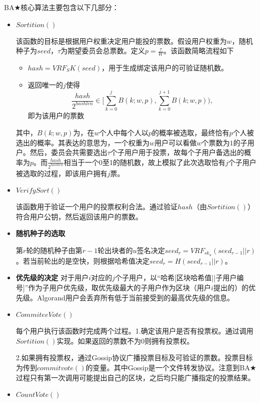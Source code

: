 BA$\bigstar$核心算法主要包含以下几部分：
\begin{itemize}
	\item $Sortition()$
	
	该函数的目标是根据用户权重决定用户能投的票数。假设用户权重为$w$，随机种子为$seed$，$\tau$为期望委员会总票数。定义$p=\frac{\tau}{W}$。该函数简略流程如下
	\begin{itemize}
		\item $hash= VRF_SK(seed)$，用于生成绑定该用户的可验证随机数。
		\item 返回唯一的$j$使得
		$$\frac{hash}{2^{hashlen}} \in [\sum_{k=0}^j B(k;w,p),\sum_{k=0}^{j+1}B(k;w,p)),$$即为该用户的票数
	\end{itemize}
	其中，$B(k;w,p)$为，在$w$个人中每个人以$p$的概率被选取，最终恰有$p$个人被选出的概率。其表达的意思为，一个权重为$w$用户可以看做$w$个票数为$1$的子用户。然后，委员会共需要选出$\tau$个子用户用于投票，故每个子用户备选出的概率为$p$。而$\frac{hash}{2^{hashlen}}$相当于一个0至1的随机数，故上模拟了此次选取恰有$j$个子用户被选取的过程，即该用户拥有$j$票。
		
	\item $VerifySort()$
	
	该函数用于验证一个用户的投票权利合法。通过验证$hash$（由$Sortition()$）符合用户公钥，然后返回该用户的票数。
	
	\item \textbf{随机种子的选取}
	
	第$r$轮的随机种子由第$r-1$轮出块者的$u$签名决定$seed_r=VRF_{sk_u}(seed_{r-1}||r)$。若当前轮出的是空快，则根据哈希值决定$seed_r=H(seed_{r-1}||r)$。
	
	\item \textbf{优先级的决定}
	对于用户$i$对应的$j$个子用户，以“哈希[区块哈希值||子用户编号]”作为子用户优先级，取优先级最大的子用户作为区块（用户$i$提出的）的优先级。Algorand用户会丢弃所有低于当前接受到的最高优先级的信息。
	
	\item $CommiteeVote()$
	
	每个用户执行该函数时完成两个过程。1.确定该用户是否有投票权。通过调用$Sortition()$实现。如果返回的票数不为0则拥有投票权。
	
	2.如果拥有投票权，通过Gossip协议广播投票目标及可验证的票数。投票目标为传到$commitvote()$的变量。其中Gossip是一个文件转发协议。注意到BA$\bigstar$过程只有第一次调用可能提出自己的区块，之后均只能广播指定的投票结果。
	
	\item $CountVote()$
	

\end{itemize}

